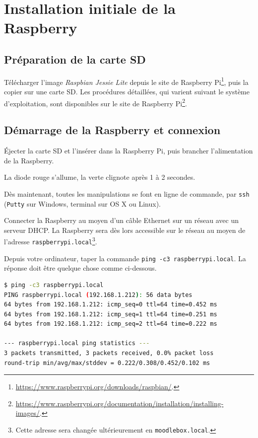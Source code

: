 \documentclass[11pt]{article}
\begin{document}
\section{Installation initiale de la Raspberry}

\subsection{Préparation de la carte SD}

Télécharger l'image \emph{Raspbian Jessie Lite} depuis le site de Raspberry Pi\footnote{\url{https://www.raspberrypi.org/downloads/raspbian/}.}, puis la copier sur une carte SD. Les procédures détaillées, qui varient suivant le système d'exploitation, sont disponibles sur le site de Raspberry Pi\footnote{\url{https://www.raspberrypi.org/documentation/installation/installing-images/}.}.

\subsection{Démarrage de la Raspberry et connexion}

Éjecter la carte SD et l'insérer dans la Raspberry Pi, puis brancher l'alimentation de la Raspberry.

\begin{verification}
La diode rouge s'allume, la verte clignote après 1 à 2 secondes.
\end{verification}


Dès maintenant, toutes les manipulations se font en ligne de commande, par \lstinline{ssh} (\lstinline{Putty} sur Windows, terminal sur OS X ou Linux).

Connecter la Raspberry au moyen d'un câble Ethernet sur un réseau avec un serveur DHCP. La Raspberry sera dès lors accessible sur le réseau au moyen de l'adresse \lstinline{raspberrypi.local}\footnote{Cette adresse sera changée ultérieurement en \lstinline{moodlebox.local}.}.

\begin{verification}
Depuis votre ordinateur, taper la commande \lstinline{ping -c3 raspberrypi.local}. La réponse doit être quelque chose comme ci-dessous.

\begin{lstlisting}[language=bash]
$ ping -c3 raspberrypi.local
PING raspberrypi.local (192.168.1.212): 56 data bytes
64 bytes from 192.168.1.212: icmp_seq=0 ttl=64 time=0.452 ms
64 bytes from 192.168.1.212: icmp_seq=1 ttl=64 time=0.251 ms
64 bytes from 192.168.1.212: icmp_seq=2 ttl=64 time=0.222 ms

--- raspberrypi.local ping statistics ---
3 packets transmitted, 3 packets received, 0.0% packet loss
round-trip min/avg/max/stddev = 0.222/0.308/0.452/0.102 ms
\end{lstlisting}
\end{verification}
\end{document}
